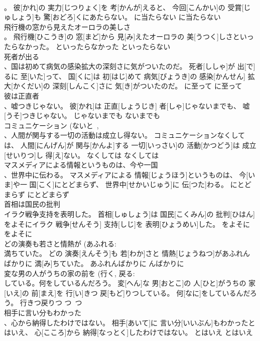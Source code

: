 \documentclass[8pt]{extreport}
\begin{document}
\begin{CJK}{UTF8}{min}
\\	。	彼[かれ]の 実力[じつりょく]を 考[かんが]えると、 今回[こんかい]の 受賞[じゅしょう]も 驚[おどろ]くにあたらない。	に当たらない	に当たらない	
\\	飛行機の窓から見えたオーロラの美しさ 
\\	。	飛行機[ひこうき]の 窓[まど]から 見[み]えたオーロラの 美[うつく]しさといったらなかった。	といったらなかった	といったらない	
\\	死者が出る 
\\	、国は初めて病気の感染拡大の深刻さに気がついたのだ。	死者[ししゃ]が 出[で]るに 至[いた]って、 国[くに]は 初[はじ]めて 病気[びょうき]の 感染[かんせん] 拡大[かくだい]の 深刻[しんこく]さに 気[き]がついたのだ。	に至って	に至って	
\\	彼は正直者 
\\	、嘘つきじゃない。	彼[かれ]は 正直[しょうじき] 者[しゃ]じゃないまでも、 嘘[うそ]つきじゃない。	じゃないまでも	ないまでも	
\\	コミュニケーション (ないと~, 
\\	、人間が関与する一切の活動は成立し得ない。	コミュニケーションなくしては、 人間[にんげん]が 関与[かんよ]する 一切[いっさい]の 活動[かつどう]は 成立[せいりつ]し 得[え]ない。	なくしては	なくしては	
\\	マスメディアによる情報というものは、今や一国 
\\	、世界中に伝わる。	マスメディアによる 情報[じょうほう]というものは、 今[いま]や一 国[こく]にとどまらず、 世界中[せかいじゅう]に 伝[つた]わる。	にとどまらず	にとどまらず	
\\	首相は国民の批判 
\\	イラク戦争支持を表明した。	首相[しゅしょう]は 国民[こくみん]の 批判[ひはん]をよそにイラク 戦争[せんそう] 支持[しじ]を 表明[ひょうめい]した。	をよそに	をよそに	
\\	どの演奏も若さと情熱が (あふれる: 
\\	満ちていた。	どの 演奏[えんそう]も 若[わか]さと 情熱[じょうねつ]があふれんばかりに 満[み]ちていた。	あふれんばかりに	んばかりに	
\\	変な男の人がうちの家の前を (行く, 戻る: 
\\	している。何をしているんだろう。	変[へん]な 男[おとこ]の 人[ひと]がうちの 家[いえ]の 前[まえ]を 行[い]きつ 戻[もど]りつしている。 何[なに]をしているんだろう。	行きつ戻りつ	つ~つ	
\\	相手に言い分もわかった 
\\	、心から納得したわけではない。	相手[あいて]に 言い分[いいぶん]もわかったとはいえ、 心[こころ]から 納得[なっとく]したわけではない。	とはいえ	とはいえ	

\end{CJK}
\end{document}
